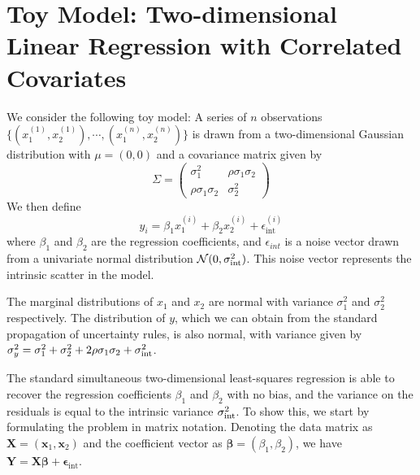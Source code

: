 \section{Toy Model: Two-dimensional Linear Regression with Correlated Covariates} \label{sec:toy_model}
We consider the following toy model: A series of $n$ observations $\{(x_1^{(1)}, x_2^{(1)}), \cdots, (x_1^{(n)}, x_2^{(n)})\}$ is drawn from a two-dimensional Gaussian distribution with $\mu=(0, 0)$ and a covariance matrix given by
\begin{equation}
    \Sigma = \left(
    \begin{matrix}
        \sigma_1^2 & \rho\sigma_1\sigma_2\\
        \rho\sigma_1\sigma_2 & \sigma_2^2
    \end{matrix}
    \right)
\end{equation}
We then define
\begin{equation}
    y_i=\beta_1 x_1^{(i)} + \beta_2 x_2^{(i)} + \epsilon_{\text{int}}^{(i)}
\label{eqn:linear_model}
\end{equation}
where $\beta_1$ and $\beta_2$ are the regression coefficients, and $\epsilon_{int}$ is a noise vector drawn from a univariate normal distribution $\mathcal{N}(0, \sigma_{\text{int}}^2)$. This noise vector represents the intrinsic scatter in the model. 


The marginal distributions of $x_1$ and $x_2$ are normal with variance $\sigma_1^2$ and $\sigma_2^2$ respectively. The distribution of $y$, which we can obtain from the standard propagation of uncertainty rules, is also normal, with variance given by $\sigma_y^2=\sigma_1^2 + \sigma_2^2 + 2\rho\sigma_1\sigma_2+\sigma_{\text{int}}^2$.

The standard simultaneous two-dimensional least-squares regression is able to recover the regression coefficients $\beta_1$ and $\beta_2$ with no bias, and the variance on the residuals is equal to the intrinsic variance $\sigma_{\text{int}}^2$. To show this, we start by formulating the problem in matrix notation. Denoting the data matrix as $\mathbf{X}=(\mathbf{x}_1, \mathbf{x}_2)$ and the coefficient vector as $\bm{\beta}=(\beta_1, \beta_2)$, we have $\bm{Y}=\bm{X\beta}+\bm{\epsilon}_\text{int}$.

